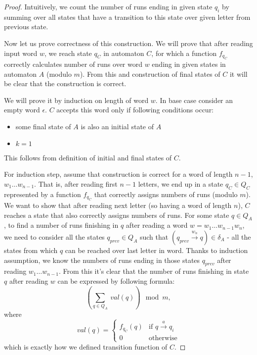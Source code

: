 \documentclass[12pt]{article}
\theoremstyle{definition}
\begin{document}
\begin{proof}
    Intuitively, we count the number of runs ending in given state $q_i$ by summing over all states that have a transition to this state over given letter from previous state.

    Now let us prove correctness of this construction. We will prove that after reading input word $w$, we reach state $q_C$ in automaton $C$, for which a function $f_{q_C}$ correctly calculates number of runs over word $w$ ending in given states in automaton $A$ (modulo $m$). From this and construction of final states of $C$ it will be clear that the construction is correct.

    We will prove it by induction on length of word $w$.
    In base case consider an empty word $\epsilon$. $C$ accepts this word only if following conditions occur:
    \begin{itemize}
        \item some final state of $A$ is also an initial state of $A$
        \item $k = 1$
    \end{itemize}
    This follows from definition of initial and final states of $C$.
    
    For induction step, assume that construction is correct for a word of length $n-1$, $w_1 \ldots w_{n-1}$. That is, after reading first $n-1$ letters, we end up in a state $q_C \in Q_C$ represented by a function $f_{q_C}$ that correctly assigns numbers of runs (modulo $m$). We want to show that after reading next letter (so having a word of length $n$), $C$ reaches a state that also correctly assigns numbers of runs. For some state $q \in Q_A$, to find a number of runs finishing in $q$ after reading a word $w = w_1\ldots w_{n-1}w_n$, we need to consider all the states $q_{prev} \in Q_A$ such that $(q_{prev} \xrightarrow{w_n} q) \in \delta_A$ - all the states from which $q$ can be reached over last letter in word. Thanks to induction assumption, we know the numbers of runs ending in those states $q_{prev}$ after reading $w_1 \ldots w_{n-1}$. From this it's clear that the number of runs finishing in state $q$ after reading $w$ can be expressed by following formula:
    $$(\sum_{q \in Q_A} \ val(q)) \mod m,$$
    where
    \begin{equation*}
        val(q) =
            \begin{cases}
            f_{q_C}(q) & \text{if $q \xrightarrow{a} q_i$} \\
            0 & \text{otherwise}
            \end{cases}       
    \end{equation*}
    which is exactly how we defined transition function of $C$.
\end{proof}
\end{document}
